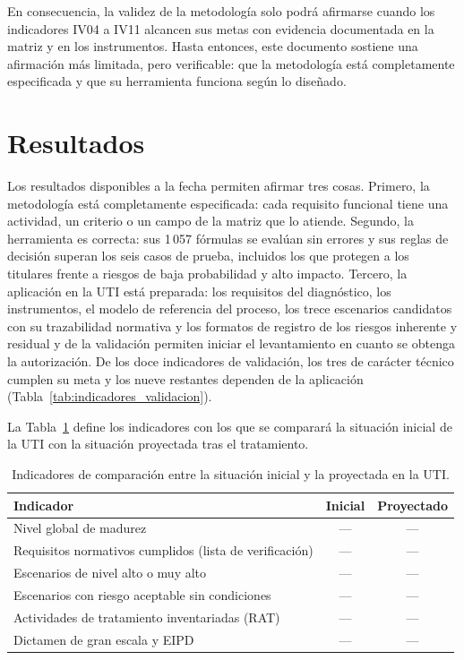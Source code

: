 En consecuencia, la validez de la metodología solo podrá afirmarse cuando los indicadores IV04 a IV11 alcancen sus metas con evidencia documentada en la matriz y en los instrumentos. Hasta entonces, este documento sostiene una afirmación más limitada, pero verificable: que la metodología está completamente especificada y que su herramienta funciona según lo diseñado.

\section{Resultados}

Los resultados disponibles a la fecha permiten afirmar tres cosas. Primero, la metodología está completamente especificada: cada requisito funcional tiene una actividad, un criterio o un campo de la matriz que lo atiende. Segundo, la herramienta es correcta: sus 1\,057 fórmulas se evalúan sin errores y sus reglas de decisión superan los seis casos de prueba, incluidos los que protegen a los titulares frente a riesgos de baja probabilidad y alto impacto. Tercero, la aplicación en la UTI está preparada: los requisitos del diagnóstico, los instrumentos, el modelo de referencia del proceso, los trece escenarios candidatos con su trazabilidad normativa y los formatos de registro de los riesgos inherente y residual y de la validación permiten iniciar el levantamiento en cuanto se obtenga la autorización. De los doce indicadores de validación, los tres de carácter técnico cumplen su meta y los nueve restantes dependen de la aplicación (Tabla~\ref{tab:indicadores_validacion}).

La Tabla~\ref{tab:antes_despues} define los indicadores con los que se comparará la situación inicial de la UTI con la situación proyectada tras el tratamiento.

\begin{table}[htbp]
  \centering
  \caption{Indicadores de comparación entre la situación inicial y la proyectada en la UTI.}
  \label{tab:antes_despues}
  \footnotesize
  \renewcommand{\arraystretch}{1.2}
  \begin{tabular}{|l|c|c|}
    \hline
    \textbf{Indicador} & \textbf{Inicial} & \textbf{Proyectado} \\
    \hline
    Nivel global de madurez & --- & --- \\
    \hline
    Requisitos normativos cumplidos (lista de verificación) & --- & --- \\
    \hline
    Escenarios de nivel alto o muy alto & --- & --- \\
    \hline
    Escenarios con riesgo aceptable sin condiciones & --- & --- \\
    \hline
    Actividades de tratamiento inventariadas (RAT) & --- & --- \\
    \hline
    Dictamen de gran escala y EIPD & --- & --- \\
    \hline
  \end{tabular}
  \par\vspace{2pt}
  \raggedright
\end{table}


